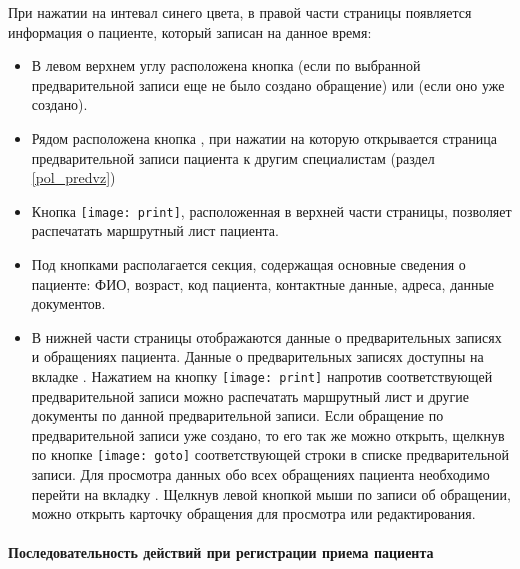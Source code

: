 {При нажатии на интевал синего цвета, в правой части страницы появляется информация о пациенте, который записан на данное время:
\begin{itemize}
	\item В левом верхнем углу расположена кнопка  (если по выбранной предварительной записи еще не было создано обращение) или  (если оно уже создано).
	\item Рядом расположена кнопка , при нажатии на которую открывается страница предварительной записи пациента к другим специалистам (раздел \ref{pol_predvz})
	\item Кнопка \texttt{[image: print]}, расположенная в верхней части страницы, позволяет распечатать маршрутный лист пациента.
	\item Под кнопками располагается секция, содержащая основные сведения о пациенте: ФИО, возраст, код пациента, контактные данные, адреса, данные документов.
	\item В нижней части страницы отображаются данные о предварительных записях и обращениях пациента. Данные о предварительных записях доступны на вкладке  . Нажатием на кнопку \texttt{[image: print]} напротив соответствующей предварительной записи можно распечатать маршрутный лист и другие документы по данной предварительной записи. Если обращение по предварительной записи уже создано, то его так же можно открыть, щелкнув по кнопке \texttt{[image: goto]} соответствующей строки в списке предварительной записи. Для просмотра данных обо всех  обращениях пациента необходимо перейти на вкладку . Щелкнув левой кнопкой мыши по записи об обращении, можно открыть карточку обращения для просмотра или редактирования.
\end{itemize}  

\paragraph{Последовательность действий при регистрации приема пациента}

}

